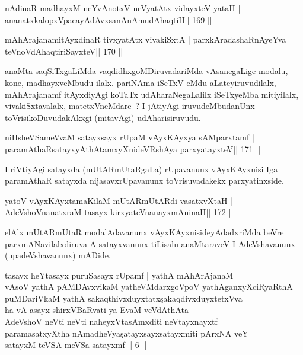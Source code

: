 
\begin{shl}
nA\s\s dinaR madhayxM neYvAnotxV neVyatAtx vidayxteV yataH |
ananatxkalopxVpacayAdAvxsanAnAmudAhaqtiH\hfill || 169 ||
\end{shl}

\begin{shl}
mAhArajanamitAyxdinaR tivxyatAtx vivakiSxtA |
parxkAradashaRnAyeYva teVnoVdAhaqtiriSayxteV\hfill || 170 ||
\end{shl}

\begin{artha}
anaMta saqSiTxgaLiMda vaqdidhxgoMDiruvadariMda vAsanegaLige modalu,
kone, madhayxveMbudu ilalx. pariNAma iSeTxV eMdu aLateyiruvudilalx,
mAhArajanamf itAyxdiyAgi koTaTx udAharaNegaLalilx iSeTxyeMba
mitiyilalx, vivakiSxtavalalx, matetxVneMdare~? I jAtiyAgi
iruvudeMbudanUnx toVrisikoDuvudakAkxgi (mitavAgi) udAharisiruvudu.
\end{artha}

\begin{shl}
niHsheVSameVvaM satayxsayx rUpaM vAyxKAyxya sAMparxtamf |
paramAthaRsatayxyAthAtamxyXnideVRshAya parxyatayxteV\hfill || 171 ||
\end{shl}

\begin{artha}
I riVtiyAgi satayxda (mUtARmUtaRgaLa) rUpavanunx vAyxKAyxnisi Iga
paramAthaR satayxda nijasavxrUpavanunx toVrisuvadakekx parxyatinxside.
\end{artha}

\begin{shl}
yatoV vAyxKAyxtamaKilaM mUtARmUtARdi vasatxvXtaH |
AdeVshoV\s nanatxraM tasayx kirxyateV\s nanayxmAninaH\hfill || 172 ||
\end{shl}

\begin{artha}
elAlx mUtARmUtaR modalAdavanunx vAyxKAyxnisideyAdadxriMda beVre
parxmANavilalxdiruva A satayxvanunx tiLisalu anaMtaraveV I
AdeVshavanunx (upadeVshavanunx) mADide.
\end{artha}



\begin{kandikeshl}
tasayx heYtasayx puruSasayx rUpamf | yathA mAhArAjanaM\\
vAsoV yathA pAMDAvxvikaM yatheVMdarxgoVpoV yathAganxyXciRyaRthA\\
puMDariVkaM yathA sakaqthivxduyxtatx\c sakaqdivxduyxtetxVva\\
ha vA asayx shirxVBaRvati ya EvaM veVdAthAta\\
AdeVshoV neVti neVti naheyxVtasAmxditi neVtayxnayxtf \\
paramasatxyXtha nAmadheVya\c satayxsayxsatayxmiti pArxNA veY\\
satayxM teVSA meVSa satayxmf || 6 ||
\end{kandikeshl}

